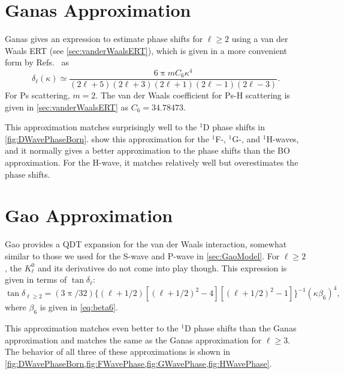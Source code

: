 \documentclass[Dissertation.tex]{subfiles}
\begin{document}


\section{Ganas Approximation}
\label{sec:GanasPhase}

Ganas \cite{Ganas1972} gives an expression to estimate phase shifts for
$\ell \geq 2$ using a van der Waals ERT (see \cref{sec:vanderWaalsERT}),
which is given in a more convenient form by
Refs.~\cite{Fabrikant2014a,Mitroy2003a,Swann2015} as
\begin{equation}
\label{eq:vdWPhase}
\delta_\ell(\kappa) \simeq \frac{6 \uppi m C_6 \kappa^4}{(2\ell+5)(2\ell+3)(2\ell+1)(2\ell-1)(2\ell-3)}.
\end{equation}
For Ps scattering, $m = 2$.
The van der Waals coefficient for Ps-H scattering is given in
\cref{sec:vanderWaalsERT} as $C_6 = 34.78473$.

This approximation matches surprisingly well to the $^1$D phase shifts in
\cref{fig:DWavePhaseBorn}. 
show this approximation for the $^1$F-, $^1$G-, and $^1$H-waves, and it normally
gives a better approximation to the phase shifts than the BO
approximation. For the H-wave,
it matches relatively well but overestimates the phase shifts.


\section{Gao Approximation}
\label{sec:GaoPhase}

Gao \cite{Gao1998a} provides a QDT expansion for the van der Waals interaction,
somewhat similar to those we used for the S-wave and P-wave in
\cref{sec:GaoModel}. For $\ell \geq 2$, the $K_\ell^0$ and its derivatives
do not come into play though. This expression is given in terms of $\tan\delta_\ell$:
\begin{equation}
\label{eq:GaoPhase}
\tan\delta_{\ell \geq 2} = (3 \uppi / 32) \{(\ell+1/2) [(\ell+1/2)^2 - 4][(\ell+1/2)^2 - 1]\}^{-1} (\kappa \beta_6)^4,
\end{equation}
where $\beta_6$ is given in \cref{eq:beta6}.

This approximation matches even better to the $^1$D phase shifts than the Ganas
approximation and matches the same as the Ganas approximation for $\ell \geq 3$.
The behavior of all three of these approximations is shown in
\cref{fig:DWavePhaseBorn,fig:FWavePhase,fig:GWavePhase,fig:HWavePhase}.
\end{document}
